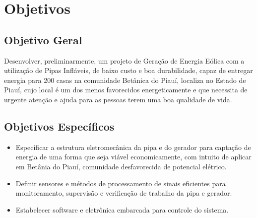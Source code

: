 \chapter[Objetivos]{Objetivos}

\section{Objetivo Geral}

Desenvolver, preliminarmente, um projeto de Geração de Energia Eólica com a utilização de Pipas Infláveis, de baixo custo e boa durabilidade, capaz de entregar energia para 200 casas na comunidade Betânica do Piauí, localiza no Estado de Piauí, cujo local é um dos menos favorecidos energeticamente e que necessita de urgente atenção e ajuda para as pessoas terem uma boa qualidade de vida. 

\section{Objetivos Específicos}

\begin{itemize}
	\item Especificar a estrutura eletromecânica da pipa e do gerador para captação de energia de uma forma que seja viável economicamente, com intuito de aplicar em Betânia do Piauí, comunidade desfavorecida de potencial elétrico. 
	\item Definir sensores e métodos de processamento de sinais eficientes para monitoramento, supervisão e verificação de trabalho da pipa e gerador.
	\item Estabelecer software e eletrônica embarcada para controle do sistema.
\end{itemize}
